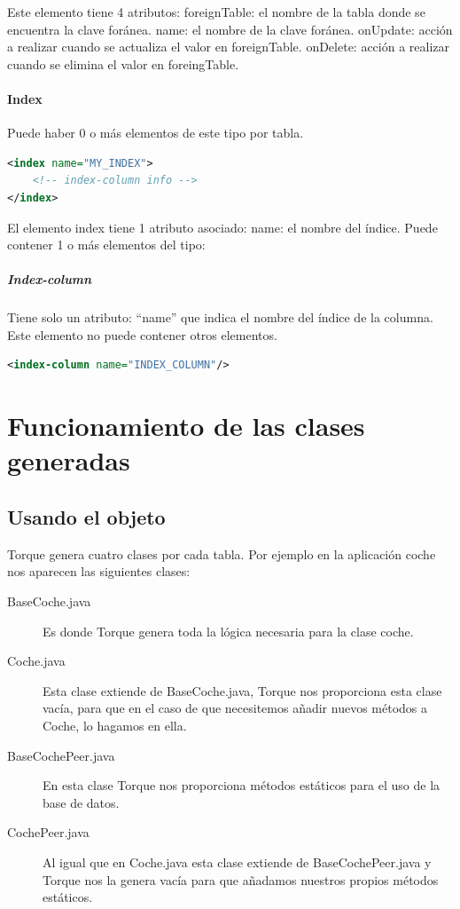 \documentclass[12pt, oneside]{article}
\begin{document}
Este elemento tiene 4 atributos:
foreignTable: el nombre de la tabla donde se encuentra la clave foránea.
name: el nombre de la clave foránea.
onUpdate: acción a realizar cuando se actualiza el valor en foreignTable.
onDelete: acción a realizar cuando se elimina el valor en foreingTable.

\paragraph{Index}
Puede haber 0 o más elementos de este tipo por tabla.

\begin{lstlisting}[language=xml]
<index name="MY_INDEX">
	<!-- index-column info -->
</index>
\end{lstlisting}

El elemento index tiene 1 atributo asociado:
name: el nombre del índice. 
Puede contener 1 o más elementos  del tipo:

\subparagraph{Index-column}
Tiene solo un atributo: “name” que indica el nombre del índice de la columna. Este elemento no puede contener otros elementos.
\begin{lstlisting}[language=xml]
<index-column name="INDEX_COLUMN"/>
\end{lstlisting}

\section{Funcionamiento de las clases generadas}
\subsection{Usando el objeto}
Torque genera cuatro clases por cada tabla. Por ejemplo en la aplicación coche nos aparecen las siguientes clases:

\begin{description}
	\item[BaseCoche.java] Es donde Torque genera toda la lógica necesaria para la clase coche.

	\item[Coche.java] Esta clase extiende de BaseCoche.java, Torque nos proporciona esta clase vacía, para que en el caso de que necesitemos añadir nuevos métodos a Coche, lo hagamos en ella.

	\item[BaseCochePeer.java] En esta clase Torque nos proporciona métodos estáticos para el uso de la base de datos.

	\item[CochePeer.java] Al igual que en Coche.java esta clase extiende de BaseCochePeer.java y Torque nos la genera vacía para que añadamos nuestros propios métodos estáticos.
\end{description}
\end{document}
